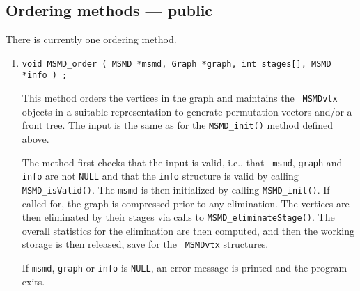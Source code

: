 \subsection{Ordering methods --- public}
\label{subsection:MSMD:proto:order}
\par
There is currently one ordering method.
\par
\begin{enumerate}
\item
\begin{verbatim}
void MSMD_order ( MSMD *msmd, Graph *graph, int stages[], MSMD *info ) ;
\end{verbatim}
This method orders the vertices in the graph and maintains the {\tt
MSMDvtx} objects in a suitable representation to generate
permutation vectors and/or a front tree.
The input is the same as for the {\tt MSMD\_init()} method defined
above.
\par
The method first checks that the input is valid, i.e., that {\tt
msmd}, {\tt graph} and {\tt info} are not {\tt NULL} and that the
{\tt info} structure is valid by calling {\tt MSMD\_isValid()}.
The {\tt msmd} is then initialized by calling {\tt MSMD\_init()}.
If called for, the graph is compressed prior to any elimination.
The vertices are then eliminated by their stages via calls to 
{\tt MSMD\_eliminateStage()}.
The overall statistics for the elimination are then computed,
and then the working storage is then released, save for the {\tt
MSMDvtx} structures.
\par {}
If {\tt msmd}, {\tt graph} or {\tt info} is {\tt NULL},
an error message is printed and the program exits.
\end{enumerate}
\par

